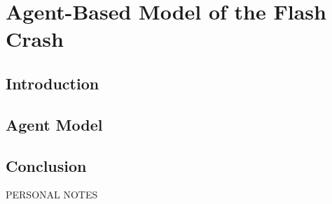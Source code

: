 %


\chapter{Agent-Based Model of the Flash Crash}
\label{chap:multiagent}

\section{Introduction}


\section{Agent Model}
\label{sec:multiagent:agent-model}


\section{Conclusion}
\label{sec:multiagent:conclusion}


\begin{mynotes}
PERSONAL NOTES
\end{mynotes}
